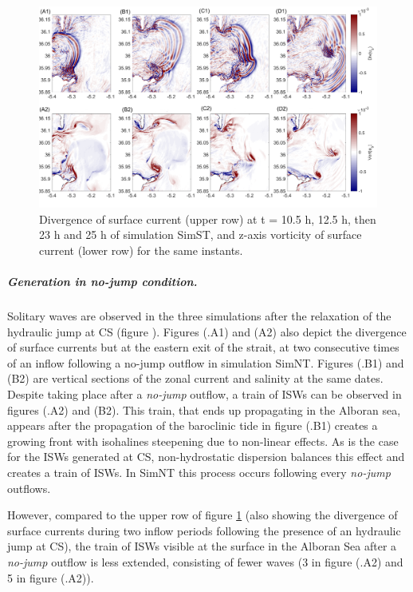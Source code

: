 \begin{figure}[!h]
 \centering
\includegraphics[width=\linewidth]{./GBR3D/FigTourbVE2.png}
 \caption [Divergence and vorticity of surface currents.]{Divergence of surface current (upper row) at t = 10.5 h, 12.5 h, then 23 h and 25 h of simulation SimST, and z-axis vorticity of surface current (lower row) for the same instants.}
 \label{FigeddGBR3D}
\end{figure}

\subparagraph{Generation in \textit{no-jump} condition.}
Solitary waves are observed in the three simulations after the relaxation of the hydraulic jump at CS (figure ). Figures (.A1) and (A2) also depict the divergence of surface currents but at the eastern exit of the strait, at two consecutive times of an inflow following a no-jump outflow in simulation SimNT. Figures (.B1) and (B2) are vertical sections of the zonal current and salinity at the same dates. Despite taking place after a \textit{no-jump} outflow, a train of ISWs can be observed in figures (.A2) and (B2). This train, that ends up propagating in the Alboran sea, appears after the propagation of the baroclinic tide in figure (.B1) creates a growing front with isohalines steepening due to non-linear effects. As is the case for the ISWs generated at CS, non-hydrostatic dispersion balances this effect and creates a train of ISWs. In SimNT this process occurs following every \textit{no-jump} outflows.

However, compared to the upper row of figure \ref{FigeddGBR3D} (also showing the divergence of surface currents during two inflow periods following the presence of an hydraulic jump at CS), the train of ISWs visible at the surface in the Alboran Sea after a \textit{no-jump} outflow is less extended, consisting of fewer waves (3 in figure (.A2) and 5 in figure (.A2)).

